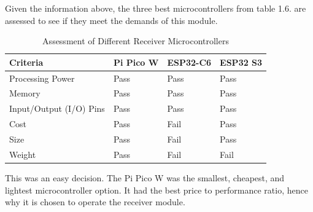 Given the information above, the three best microcontrollers from table 1.6. are assessed to see if they meet the demands of this module. 

\begin{table}[h]
\centering
\begin{tabular}{|l|l|l|l|}
\hline
\textbf{Criteria} & \textbf{Pi Pico W} & \textbf{ESP32-C6} & \textbf{ESP32 S3} \\
\hline
Processing Power & Pass & Pass & Pass \\
\hline
Memory & Pass & Pass & Pass \\
\hline
Input/Output (I/O) Pins & Pass & Pass & Pass \\
\hline
Cost & Pass & Fail & Pass \\
\hline
Size & Pass & Fail & Pass \\
\hline
Weight & Pass & Fail & Fail \\
\hline
\end{tabular}
\caption{Assessment of Different Receiver Microcontrollers}
\label{tab:microcontroller_assessment}
\end{table}

This was an easy decision. The Pi Pico W was the smallest, cheapest, and lightest microcontroller option. It had the best price to performance ratio, hence why it is chosen to operate the receiver module. 

